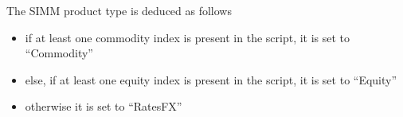 The SIMM product type is deduced as follows

\begin{itemize}
\item if at least one commodity index is present in the script, it is set to ``Commodity''
\item else, if at least one equity index is present in the script, it is set to ``Equity''
\item otherwise it is set to ``RatesFX''
\end{itemize}
